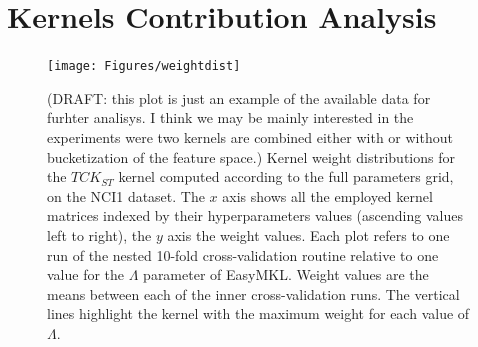 \section{Kernels Contribution Analysis}
\label{sec:kca}

\begin{figure}[ht]
    \centering
    \texttt{[image: Figures/weightdist]}
    \caption{(DRAFT: this plot is just an example of the available data for furhter analisys.
        I think we may be mainly interested in the experiments were two kernels are combined
        either with or without bucketization of the feature space.)
        Kernel weight distributions for the $TCK_{ST}$ kernel
    computed according to the full parameters grid, on the NCI1 dataset.
    The $x$ axis shows all the employed kernel matrices indexed by their hyperparameters
    values (ascending values left to right), the $y$ axis the weight values.
    Each plot refers to one run of the nested 10-fold cross-validation routine relative to one
    value for the $\Lambda$ parameter of EasyMKL. Weight values are the means between each of the inner
    cross-validation runs. The vertical lines highlight the kernel with the maximum weight for each value of $\Lambda$.}
        \label{fig:weightdist}
\end{figure}


